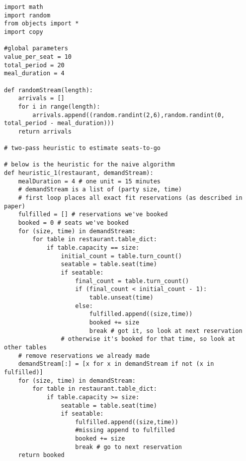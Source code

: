 \documentclass[12pt, titlepage]{article}
\begin{document}
\begin{Verbatim}[fontsize=\scriptsize]
import math
import random
from objects import *
import copy

#global parameters
value_per_seat = 10
total_period = 20
meal_duration = 4

def randomStream(length):
    arrivals = []
    for i in range(length):
        arrivals.append((random.randint(2,6),random.randint(0, total_period - meal_duration)))
    return arrivals     

# two-pass heuristic to estimate seats-to-go

# below is the heuristic for the naive algorithm
def heuristic_1(restaurant, demandStream):
    mealDuration = 4 # one unit = 15 minutes
    # demandStream is a list of (party size, time)
    # first loop places all exact fit reservations (as described in paper)
    fulfilled = [] # reservations we've booked
    booked = 0 # seats we've booked
    for (size, time) in demandStream:
        for table in restaurant.table_dict:
            if table.capacity == size:
                initial_count = table.turn_count()
                seatable = table.seat(time)
                if seatable:
                    final_count = table.turn_count()
                    if (final_count < initial_count - 1):
                        table.unseat(time)
                    else:
                        fulfilled.append((size,time))
                        booked += size
                        break # got it, so look at next reservation
                # otherwise it's booked for that time, so look at other tables
    # remove reservations we already made
    demandStream[:] = [x for x in demandStream if not (x in fulfilled)]
    for (size, time) in demandStream:
        for table in restaurant.table_dict:
            if table.capacity >= size:
                seatable = table.seat(time)
                if seatable:
                    fulfilled.append((size,time))
                    #missing append to fulfilled
                    booked += size
                    break # go to next reservation
    return booked


\end{Verbatim}
\end{document}
